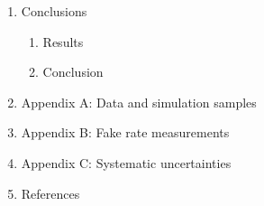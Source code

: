 \documentclass{article}
\begin{document}
\begin{enumerate}
\begin{enumerate}
        \end{enumerate}
    \item Conclusions
        \begin{enumerate}
            \item Results 
            \item Conclusion
        \end{enumerate}
    \item Appendix A: Data and simulation samples
    \item Appendix B: Fake rate measurements
    \item Appendix C: Systematic uncertainties
    \item References
\end{enumerate}
\end{document}
